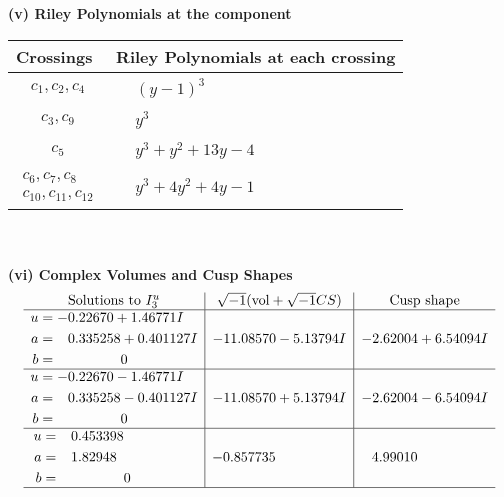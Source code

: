 \documentclass[1p]{elsarticle_modified}
\theoremstyle{definition}
\newcommand{\I}{\sqrt{-1}}
\begin{document}
\newpage\renewcommand{\arraystretch}{1}
\flushleft \textbf{(v) Riley Polynomials at the component}\newline \\
\begin{tabular}{m{50pt}|m{274pt}}
Crossings & \hspace{64pt}Riley Polynomials at each crossing \\
\hline $$\begin{aligned}c_{1},c_{2},c_{4}\end{aligned}$$&$\begin{aligned}
&(y-1)^3
\end{aligned}$\\
\hline $$\begin{aligned}c_{3},c_{9}\end{aligned}$$&$\begin{aligned}
&y^3
\end{aligned}$\\
\hline $$\begin{aligned}c_{5}\end{aligned}$$&$\begin{aligned}
&y^3+y^2+13 y-4
\end{aligned}$\\
\hline $$\begin{aligned}c_{6},c_{7},c_{8}\\c_{10},c_{11},c_{12}\end{aligned}$$&$\begin{aligned}
&y^3+4 y^2+4 y-1
\end{aligned}$\\
\hline
\end{tabular}\\~\\
\newpage\flushleft \textbf{(vi) Complex Volumes and Cusp Shapes}
$$\begin{array}{c|c|c}  
\text{Solutions to }I^u_{3}& \I (\text{vol} + \sqrt{-1}CS) & \text{Cusp shape}\\
 \hline 
\begin{aligned}
u &= -0.22670 + 1.46771 I \\
a &= \phantom{-}0.335258 + 0.401127 I \\
b &= \phantom{-0.000000 } 0\end{aligned}
 & -11.08570 - 5.13794 I & -2.62004 + 6.54094 I \\ \hline\begin{aligned}
u &= -0.22670 - 1.46771 I \\
a &= \phantom{-}0.335258 - 0.401127 I \\
b &= \phantom{-0.000000 } 0\end{aligned}
 & -11.08570 + 5.13794 I & -2.62004 - 6.54094 I \\ \hline\begin{aligned}
u &= \phantom{-}0.453398\phantom{ +0.000000I} \\
a &= \phantom{-}1.82948\phantom{ +0.000000I} \\
b &= \phantom{-0.000000 } 0\end{aligned}
 & -0.857735\phantom{ +0.000000I} & \phantom{-}4.99010\phantom{ +0.000000I}\\
 \hline 
 \end{array}$$\newpage\newpage\renewcommand{\arraystretch}{1}
\end{document}
